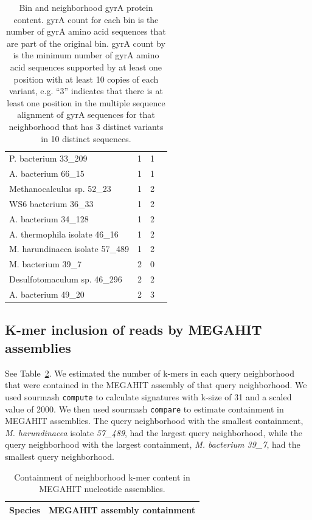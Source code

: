 \begin{table}
{\begin{tabular}{@{}l l c c @{}}
    P. bacterium 33\_209 & 1 & 1 \\
    A. bacterium 66\_15 & 1 & 1 \\
    Methanocalculus sp. 52\_23 & 1 & 2 \\
    WS6 bacterium 36\_33 & 1 & 2 \\
    A. bacterium 34\_128 & 1 & 2 \\
    A. thermophila isolate 46\_16 & 1 & 2 \\
    M. harundinacea isolate 57\_489 & 1 & 2 \\
    M. bacterium 39\_7 & 2 & 0 \\
    Desulfotomaculum sp. 46\_296 & 2 & 2 \\
    A. bacterium 49\_20 & 2 & 3 \\
    \bottomrule
  \end{tabular}
  \caption{  \label{tab:gyrAcounts}%
   Bin and neighborhood gyrA protein content. gyrA count for each bin is the number
    of gyrA amino acid sequences that are part of the original bin. gyrA count by \plass is
    the minimum number of gyrA amino acid sequences supported by at least one
    position with at least 10 copies of each variant, e.g. ``3'' indicates that
    there is at least one position in the multiple sequence alignment of gyrA
    sequences for that neighborhood that has 3 distinct variants in 10 distinct
    sequences.}
  }
\end{table}

\subsection{K-mer inclusion of reads by MEGAHIT assemblies}
\label{subsec:inclusion}

See Table~\ref{tab:kmer_inclusion}. We estimated the number of k-mers in each
query neighborhood that were contained in the MEGAHIT assembly of that query
neighborhood. We used sourmash {\tt compute} to calculate signatures with k-size of
31 and a scaled value of 2000. We then used sourmash {\tt compare} to estimate
containment in MEGAHIT assemblies. The query neighborhood with the smallest
containment, \emph{M. harundinacea} isolate \emph{57\_489}, had the largest query
neighborhood, while the query neighborhood with the largest containment,
\emph{M. bacterium 39\_7}, had the smallest query neighborhood.

\begin{table}
  \begin{tabular}{l c}
    \toprule
    Species & MEGAHIT assembly containment \\
    \midrule
    
%    
    \bottomrule
  \end{tabular}
  \caption{Containment of neighborhood k-mer content in MEGAHIT nucleotide assemblies.}
  \label{tab:kmer_inclusion}
\end{table}


